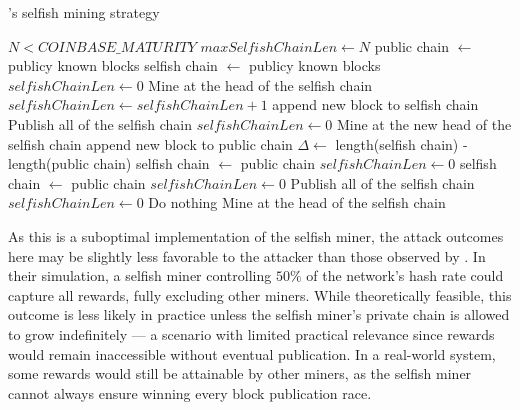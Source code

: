 \begin{algorithm}
	\caption{\iblock{}'s selfish mining strategy}\label{alg:selfish-miner}
	\begin{algorithmic}[1]
		\Require \(N < COINBASE\_MATURITY\)
		\Statex
			\State \(maxSelfishChainLen \gets N\)
			\State public chain \(\gets\) publicy known blocks
			\State selfish chain \(\gets\) publicy known blocks
			\State \(selfishChainLen \gets 0\)
			\State Mine at the head of the selfish chain
		\EndEvent
		\Statex
			\State \(selfishChainLen \gets selfishChainLen + 1\)
			\State append new block to selfish chain
				\State Publish all of the selfish chain
				\State \(selfishChainLen \gets 0\)
			\EndIf
			\State Mine at the new head of the selfish chain
		\EndEvent
		\Statex
			\State append new block to public chain
			\State \(\Delta \gets\) length(selfish chain) -
			length(public chain)
				\State selfish chain \(\gets\) public chain
				\State \(selfishChainLen \gets 0\)
				\State selfish chain \(\gets\) public chain
				\State \(selfishChainLen \gets 0\)
				\State Publish all of the selfish
				chain
				\State \(selfishChainLen \gets 0\)
			\Else{}
				\State Do nothing
			\EndIf
			\State Mine at the head of the selfish chain
		\EndEvent
	\end{algorithmic}
\end{algorithm}


As this is a suboptimal implementation of the selfish miner, the attack
outcomes here may be slightly less favorable to the attacker than those
observed by \citeauthor{selfish-mining}. In their simulation, a selfish miner
controlling \(50\%\) of the network's hash rate could capture all rewards,
fully excluding other miners. While theoretically feasible, this outcome is
less likely in practice unless the selfish miner's private chain is allowed to
grow indefinitely --- a scenario with limited practical relevance since rewards
would remain inaccessible without eventual publication. In a real-world system,
some rewards would still be attainable by other miners, as the selfish miner
cannot always ensure winning every block publication race.

